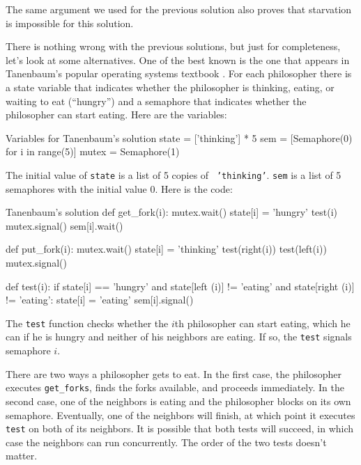 The same argument we used for the previous solution also proves
that starvation is impossible for this solution.



There is nothing wrong with the previous solutions, but just for
completeness, let's look at some alternatives.  One of the best known
is the one that appears in Tanenbaum's popular operating systems
textbook \cite{tanenbaum}.
For each philosopher there is a state variable that
indicates whether the philosopher is thinking, eating, or waiting to
eat (``hungry'') and a semaphore that indicates whether the
philosopher can start eating.  Here are the variables:

\begin{lstbox}{Variables for Tanenbaum's solution}
state = ['thinking'] * 5
sem = [Semaphore(0) for i in range(5)]
mutex = Semaphore(1)
\end{lstbox}

The initial value of {\tt state} is a list of 5 copies of {\tt
'thinking'}.  {\tt sem} is a list of 5 semaphores with the initial
value 0.  Here is the code:

\begin{lstbox}{Tanenbaum's solution}
def get_fork(i):
    mutex.wait()
    state[i] = 'hungry'
    test(i)
    mutex.signal()
    sem[i].wait()

def put_fork(i):
    mutex.wait()
    state[i] = 'thinking'
    test(right(i))
    test(left(i))
    mutex.signal()

def test(i):
    if state[i] == 'hungry' and
    state[left (i)]  != 'eating' and
    state[right (i)] != 'eating':
        state[i] = 'eating'
        sem[i].signal()
\end{lstbox}


The {\tt test} function checks whether the $i$th philosopher can
start eating, which he can if he is hungry and
neither of his neighbors are eating.  If so, the {\tt test} signals
semaphore $i$.

There are two ways a philosopher gets to eat.  In the first case, the
philosopher executes {\tt get\_forks}, finds the forks available, and
proceeds immediately.  In the second case, one of the neighbors is
eating and the philosopher blocks on its own semaphore.  Eventually,
one of the neighbors will finish, at which point it executes {\tt
test} on both of its neighbors.  It is possible that both tests
will succeed, in which case the neighbors can run concurrently.
The order of the two tests doesn't matter.


